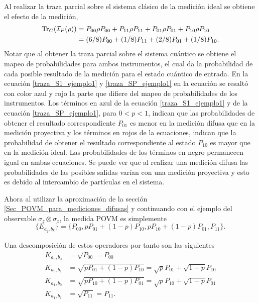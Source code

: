 Al realizar la traza parcial sobre el sistema clásico de la medición ideal se obtiene el efecto de la medición,\begin{equation}\label{traza_AP_ejemploP}\begin{split}
       {\rm Tr}_C(\mathcal{I}_P(\rho)) &= P_{00} \rho P_{00} + P_{11}\rho P_{11}+ P_{01}\rho P_{01}+P_{10}\rho P_{10}\\
      &=(6/8)P_{00} + (1/8)P_{11}+(2/8) P_{01}+ (1/8)P_{10}.\\
 \end{split}
\end{equation}
Notar que al obtener la traza parcial sobre el sistema cuántico se obtiene el
mapeo de probabilidades para ambos instrumentos, el cual da la probabilidad de
cada posible resultado de la medición para el estado cuántico de entrada. En la
ecuación {\ref{traza_S1_ejemplo1}}  y {\ref{traza_SP_ejemplo1}} en la ecuación
se resaltó con color azul y rojo la parte que difiere del mapeo de
probabilidades de los instrumentos. Los términos en azul de la ecuación
{\ref{traza_S1_ejemplo1}} y de la ecuación {\ref{traza_SP_ejemplo1}}, para
$0<p<1$, indican que las probabilidades de obtener el resultado correspondiente
$P_{01}$ es menor en la medición difusa que en la medición proyectiva y los
términos en rojos de la ecuaciones, indican que la probabilidad de obtener el
resultado correspondiente al estado $P_{10}$ es mayor que en la medición
ideal. Las probabilidades de los términos en negro permanecen igual en ambas
ecuaciones.  Se puede ver que al realizar una medición difusa las
probabilidades de las posibles salidas varían con una medición proyectiva y
esto es debido al intercambio de partículas en el sistema. 



Ahora al utilizar la aproximación de la sección {\ref{Sec_POVM_para_mediciones_difusas}} y continuando con el ejemplo del observable $\sigma_z \otimes \sigma_z$, la medida POVM es simplemente \[\{E_{a_j, b_k}\}= \{P_{00},p P_{01}+(1-p)P_{10},p P_{10}+(1-p)P_{01},P_{11}\}.\] 

Una descomposición de estos operadores por tanto son las siguientes
\begin{equation}
    \begin{split}
        K_{a_0,b_0}&=\sqrt{P_{00}}=P_{00}\\
        K_{a_0,b_1}&=\sqrt{p P_{01}+(1-p)P_{10}}=\sqrt{p}P_{01}+\sqrt{1-p}P_{10}\\
        K_{a_1,b_0}&=\sqrt{p P_{10}+(1-p)P_{01}}=\sqrt{p}P_{10}+\sqrt{1-p}P_{01}\\
        K_{a_1,b_1}&=\sqrt{P_{11}}=P_{11}.\\
\end{split}
\end{equation} 

